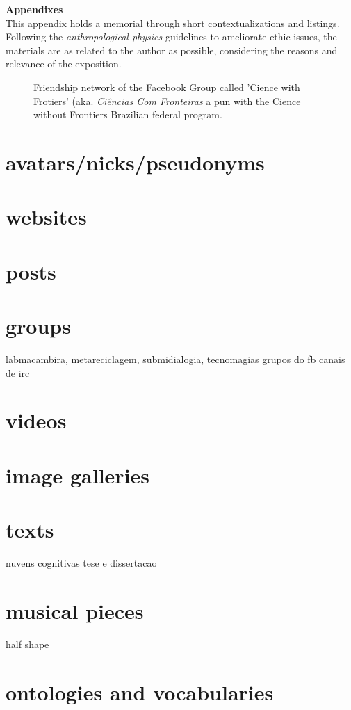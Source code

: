 \documentclass[a4paper]{article}
\begin{document}
\clearpage
{} 
\begin{appendices}
{\Large \bf Appendixes}
\\

This appendix holds a memorial through short contextualizations
and listings.
Following the \emph{anthropological physics} guidelines to ameliorate
ethic issues, the materials are as related to the author as possible,
considering the reasons and relevance of the exposition.

\begin{figure}\label{nh}
  \centering
  \caption{Friendship network of the Facebook Group called 'Cience with Frotiers' (aka. \emph{Ciências Com Fronteiras} a pun with the Cience without Frontiers Brazilian federal program.}
\end{figure}

\section{avatars/nicks/pseudonyms}\label{avatar}
\section{websites}
\section{posts}\label{posts}
\section{groups}
labmacambira, metareciclagem, submidialogia, tecnomagias
grupos do fb
canais de irc
\section{videos}
\section{image galleries}
\section{texts}
nuvens cognitivas
tese e dissertacao
\section{musical pieces}
half shape
\section{ontologies and vocabularies}
\end{appendices}
\end{document}
